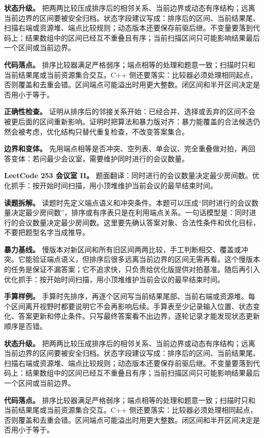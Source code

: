 \textbf{状态升级。} 把两两比较压成排序后的相邻关系、当前边界或动态有序结构；远离当前边界的区间要被安全归档。状态字段建议写成：排序后的区间、当前结果尾、扫描右端或资源堆、端点比较规则；动态版本还要保存前驱后继。不变量要落到代码上：结果数组中的区间已经互不重叠且有序；当前扫描区间只可能影响结果最后一个区间或当前边界。

\textbf{代码落点。} 排序比较器满足严格弱序；端点相等的处理和题意一致；扫描时只和当前结果尾或当前资源集合交互。C++ 侧还要落实：比较器必须处理相同起点，否则覆盖和去重会错。区间端点可能溢出时用更大整数。闭区间和半开区间决定是否用小于等于。

\textbf{正确性检查。} 证明从排序后的邻接关系开始：已经合并、选择或丢弃的区间不会被更后面的区间重新影响。证明时把算法和暴力版对齐：暴力能覆盖的合法候选仍然会被考虑，优化结构只替代重复检查，不改变答案集合。

\textbf{边界和变体。} 先用端点相等是否冲突、空列表、单会议、完全重叠做对拍，再回答变体：若问最少会议室，需要维护同时进行的会议数量。

\noindent\textbf{LeetCode 253 会议室 II。} 题面翻译：同时进行的会议数量决定最少房间数。优化抓手：按开始时间扫描，用小顶堆维护当前会议的最早结束时间。

\textbf{读题拆解。} 读题时先定义端点语义和冲突条件。本题可以压成“同时进行的会议数量决定最少房间数”，排序或有序表只是在利用端点关系。一句话模型是：同时进行的会议数量决定最少房间数。这里要先确认答案对象、合法性条件和优化目标，不要把题型名字当成推导。

\textbf{暴力基线。} 慢版本对新区间和所有旧区间两两比较，手工判断相交、覆盖或冲突。它能验证端点语义，但排序后很多远离当前边界的区间无需再看。这个慢版本的任务是保证不漏答案；它不追求快，只负责给优化版提供对拍基准。随后再引入优化抓手：按开始时间扫描，用小顶堆维护当前会议的最早结束时间。

\textbf{手算样例。} 手算时先排序，再逐个区间写当前结果尾部、当前右端或资源堆。每个区间离开视野时都要说明它不会再影响后续。手算表至少记录输入位置、状态变化、答案更新和停止条件。只写最终答案看不出边界，逐轮记录才能发现状态更新顺序是否错。

\textbf{状态升级。} 把两两比较压成排序后的相邻关系、当前边界或动态有序结构；远离当前边界的区间要被安全归档。状态字段建议写成：排序后的区间、当前结果尾、扫描右端或资源堆、端点比较规则；动态版本还要保存前驱后继。不变量要落到代码上：结果数组中的区间已经互不重叠且有序；当前扫描区间只可能影响结果最后一个区间或当前边界。

\textbf{代码落点。} 排序比较器满足严格弱序；端点相等的处理和题意一致；扫描时只和当前结果尾或当前资源集合交互。C++ 侧还要落实：比较器必须处理相同起点，否则覆盖和去重会错。区间端点可能溢出时用更大整数。闭区间和半开区间决定是否用小于等于。

